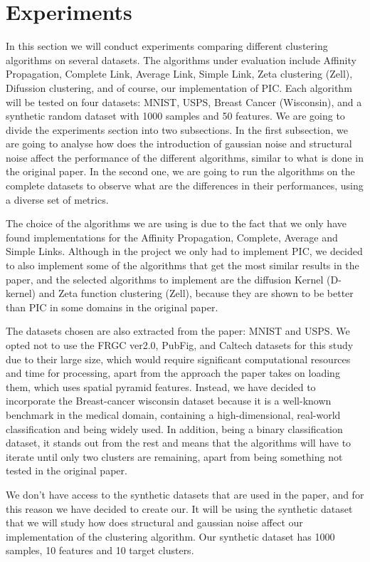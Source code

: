 \documentclass[
	10pt,
	parskip=half-,	
	paper=a4,
	english
	]{scrartcl}
\begin{document}
\section {Experiments}

In this section we will conduct experiments comparing different clustering algorithms on several datasets. The algorithms under evaluation include Affinity Propagation, Complete Link, Average Link, Simple Link, Zeta clustering (Zell), Difussion clustering, and of course, our implementation of PIC. Each algorithm will be tested on four datasets: MNIST, USPS, Breast Cancer (Wisconsin), and a synthetic random dataset with 1000 samples and 50 features. We are going to divide the experiments section into two subsections. In the first subsection, we are going to analyse how does the introduction of gaussian noise and structural noise affect the performance of the different algorithms, similar to what is done in the original paper. In the second one, we are going to run the algorithms on the complete datasets to observe what are the differences in their performances, using a diverse set of metrics.

The choice of the algorithms we are using is due to the fact that we only have found implementations for the Affinity Propagation, Complete, Average and Simple Links. Although in the project we only had to implement PIC, we decided to also implement some of the algorithms that get the most similar results in the paper, and the selected algorithms to implement are the diffusion Kernel (D-kernel) and Zeta function clustering (Zell), because they are shown to be better than PIC in some domains in the original paper.

The datasets chosen are also extracted from the paper: MNIST and USPS. We opted not to use the FRGC ver2.0, PubFig, and Caltech datasets for this study due to their large size, which would require significant computational resources and time for processing, apart from the approach the paper takes on loading them, which uses spatial pyramid features. Instead, we have decided to incorporate the Breast-cancer wisconsin dataset because it is a well-known benchmark in the medical domain, containing a high-dimensional, real-world classification and being widely used. In addition, being a binary classification dataset, it stands out from the rest and means that the algorithms will have to iterate until only two clusters are remaining, apart from being something not tested in the original paper.

We don't have access to the synthetic datasets that are used in the paper, and for this reason we have decided to create our. It will be using the synthetic dataset that we will study how does structural and gaussian noise affect our implementation of the clustering algorithm. Our synthetic dataset has 1000 samples, 10 features and 10 target clusters.
\end{document}
